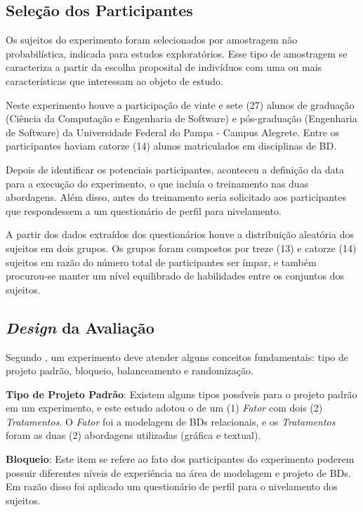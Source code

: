 \subsection{Seleção dos Participantes} \label{ssec:participExp}

Os sujeitos do experimento foram selecionados por amostragem não probabilística, indicada para estudos exploratórios.
Esse tipo de amostragem se caracteriza a partir da escolha proposital de indivíduos com uma ou mais características que interessam ao objeto de estudo. 

Neste experimento houve a participação de vinte e sete (27) alunos de graduação (Ciência da Computação e Engenharia de Software) e pós-graduação (Engenharia de Software) da Universidade Federal do Pampa - Campus Alegrete. 
Entre os participantes haviam catorze (14) alunos matriculados em disciplinas de \ac{BD}. 

Depois de identificar os potenciais participantes, aconteceu a definição da data para a execução do experimento, o que incluía o treinamento nas duas abordagens.
Além disso, antes do treinamento seria solicitado aos participantes que respondessem a um questionário de perfil para nivelamento. 

A partir dos dados extraídos dos questionários houve a distribuição aleatória dos sujeitos em dois grupos. 
Os grupos foram compostos por treze (13) e catorze (14) sujeitos em razão do número total de participantes ser ímpar,  e também procurou-se manter um nível equilibrado de habilidades entre os conjuntos dos sujeitos.

\subsection{\textit{Design} da Avaliação} \label{ssec:designExp}

Segundo , um experimento deve atender alguns conceitos fundamentais: tipo de projeto padrão, bloqueio, balanceamento e randomização. 

\textbf{Tipo de Projeto Padrão}: Existem alguns tipos possíveis para o projeto padrão em um experimento, e este estudo adotou o de um (1) \textit{Fator} com dois (2) \textit{Tratamentos}. O \textit{Fator} foi a modelagem de \acp{BD} relacionais, e os \textit{Tratamentos} foram as duas (2) abordagens utilizadas (gráfica e textual).

\textbf{Bloqueio}: Este item se refere ao fato dos participantes do experimento poderem possuir diferentes níveis de experiência na área de modelagem e projeto de \acp{BD}. 
Em razão disso foi aplicado um questionário de perfil para o nivelamento dos sujeitos.

